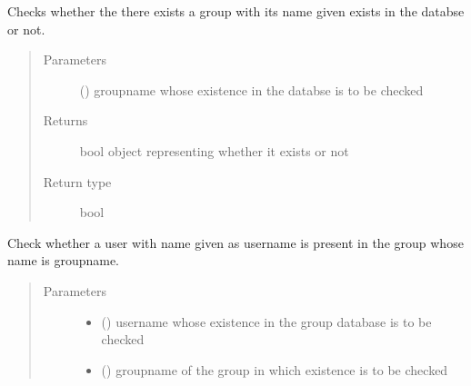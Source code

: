 \documentclass[letterpaper,10pt,english]{sphinxmanual}
\begin{document}
\begin{fulllineitems}
\begin{fulllineitems}
\label{\detokenize{sql:sql.Database.check_groupname}}
Checks whether the there exists a group with its name given exists in the databse or not.
\begin{quote}\begin{description}
\item[{Parameters}] \leavevmode
{} () \textendash{} groupname whose existence in the databse is to be checked

\item[{Returns}] \leavevmode
bool object representing whether it exists or not

\item[{Return type}] \leavevmode
bool

\end{description}\end{quote}

\end{fulllineitems}


\begin{fulllineitems}
\label{\detokenize{sql:sql.Database.check_user_in_group}}
Check whether a user with name given as username is present in the group whose name is groupname.
\begin{quote}\begin{description}
\item[{Parameters}] \leavevmode\begin{itemize}
\item {} 
 () \textendash{} username whose existence in the group database is to be checked

\item {} 
 () \textendash{} groupname of the group in which existence is to be checked

\end{itemize}


\end{description}
\end{quote}
\end{fulllineitems}
\end{fulllineitems}
\end{document}
